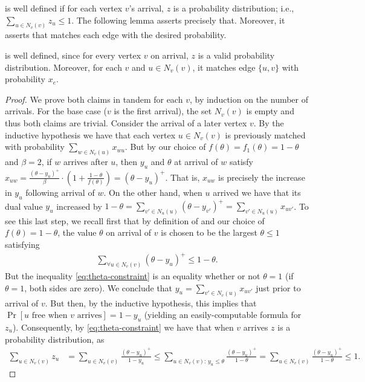  is well defined if for each vertex $v$'s arrival, $z$ is a probability distribution; i.e., $\sum_{u\in N_v(v)} z_u\leq 1$. The following lemma asserts precisely that. Moreover, it asserts that  matches each edge with the desired probability.

\begin{lem}\label{lem:z-distribution}
 is well defined, since for every vertex $v$ on arrival, $z$ is a valid probability distribution. Moreover, for each $v$ and $u\in N_v(v)$, it matches edge $\{u,v\}$ with probability $x_e$.
\end{lem}
\begin{proof}
	We prove both claims in tandem for each $v$, by induction on the number of arrivals. 
	For the base case ($v$ is the first arrival), the set $N_v(v)$ is empty and thus both claims are trivial. Consider the arrival of a later vertex $v$.
	By the inductive hypothesis we have that each vertex $u\in N_v(v)$ is previously matched with probability $\sum_{w\in N_v(u)} x_{wu}$.
	But by our choice of $f(\theta)=f_1(\theta)=1-\theta$ and $\beta=2$, if $w$ arrives after $u$, then $y_u$ and $\theta$ at arrival of $w$ satisfy $x_{uw} = \frac{(\theta - y_u)^{+}}{\beta}\cdot \left(1+\frac{1-\theta}{f(\theta)}\right) = (\theta - y_u)^{+}$. 
	That is, $x_{uw}$ is precisely the increase in $y_u$ following arrival of $w$.
	On the other hand, when $u$ arrived we have that its dual value $y_u$ increased by $1-\theta = \sum_{v'\in N_u(u)} (\theta - y_{v'})^+ = \sum_{v'\in N_u(u)} x_{uv'}$. 
	To see this last step, we recall first that by definition of  and our choice of $f(\theta)=1-\theta$, the value $\theta$ on arrival of $v$ is chosen to be the largest $\theta\leq 1$ satisfying  
	\begin{align}\label{eq:theta-constraint}
		\sum_{\forall u \in N_v(v)} (\theta - y_u)^{+}\leq 1-\theta.
	\end{align}
	But the inequality \eqref{eq:theta-constraint} is an equality whether or not $\theta=1$ (if $\theta=1$, both sides are zero).
	We conclude that $y_u = \sum_{v'\in N_v(u)} x_{uv'}$ just prior to arrival of $v$. 
	But then, by the inductive hypothesis, this implies that $\Pr[\mbox{$u$ free when $v$ arrives}] = 1-y_u$ (yielding an easily-computable formula for $z_u$).
	Consequently, by \eqref{eq:theta-constraint} we have that when $v$ arrives $z$ is a probability distribution, as
	\begin{align*}
	\sum_{u\in N_v(v)} z_u & = \sum_{u\in N_v(v)} \frac{(\theta - y_u)^{+}}{1-y_u} \leq \sum_{u\in N_v(v):\, y_u\leq \theta} \frac{(\theta - y_u)^{+}}{1-\theta} = \sum_{u\in N_v(v)} \frac{(\theta - y_u)^{+}}{1-\theta} \leq 1.
	\end{align*}
	

\end{proof}
